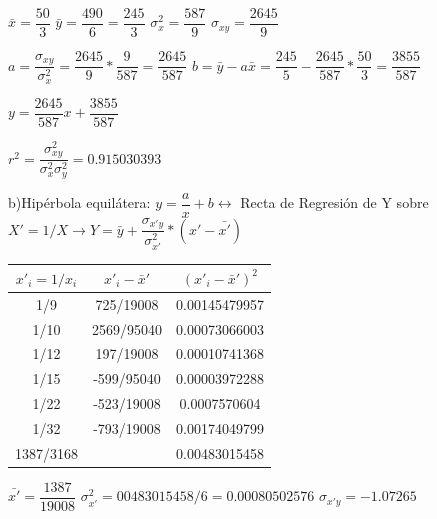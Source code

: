 \documentclass[10pt,a4paper]{article}
\begin{document}
\begin{enumerate}
\vspace{0.25cm}
$\bar{x} = \dfrac{50}{3}$	\hspace{2cm} $\bar{y} = \dfrac{490}{6} = \dfrac{245}{3}$ \hspace{2cm} $\sigma_x^2 = \dfrac{587}{9}$ \hspace{2cm}  $\sigma_{xy} = \dfrac{2645}{9}$

\vspace{0.25cm}
$a = \dfrac{\sigma_{xy}}{\sigma_{x}^2} = \dfrac{2645}{9} * \dfrac{9}{587} = \dfrac{2645}{587}$ \hspace{2 cm} $b = \bar{y} - a \bar{x} = \dfrac{245}{5} - \dfrac{2645}{587} * \dfrac{50}{3} = \dfrac{3855}{587}$

\vspace{0.25cm}
\begin{center}
$y = \dfrac{2645}{587} x + \dfrac{3855}{587}$ \\  
\end{center}

\vspace{0.25cm} 
$r^2 = \dfrac{\sigma_{xy}^2}{\sigma_x^2 \sigma_y^2} = 0.915030393 $

\vspace{0.5cm} 
\hspace{0.25cm} b)Hipérbola equilátera: $y = \dfrac{a}{x} +b \longleftrightarrow$ Recta de Regresión de Y sobre $X' = 1/X \rightarrow Y = \bar{y} + \dfrac{\sigma_{x'y}}{\sigma_{x'}^2} * (x' - \bar{x'})$

\vspace{0.25cm}
\begin{tabular}{|c|c|c|}
\hline 
$x'_i = 1/x_i$ & $x'_i - \bar{x}'$ & $(x'_i - \bar{x}')^2$ \\ 
\hline 
1/9 & 725/19008 & 0.00145479957 \\ 
\hline 
1/10 & 2569/95040 & 0.00073066003 \\ 
\hline 
1/12 & 197/19008 & 0.00010741368 \\ 
\hline 
1/15 & -599/95040 & 0.00003972288 \\ 
\hline 
1/22 & -523/19008 & 0.0007570604 \\ 
\hline 
1/32 & -793/19008 & 0.00174049799 \\ 
\hline 
1387/3168 &   & 0.00483015458 \\ 
\hline 
\end{tabular} 

\vspace{0.25cm}
$\bar{x'} = \dfrac{1387}{19008}$ \hspace{2cm} $\sigma_{x'}^2 = 00483015458/6 = 0.00080502576$ \hspace{2cm} $\sigma_{x'y} = -1.07265$


\end{enumerate}
\end{document}
